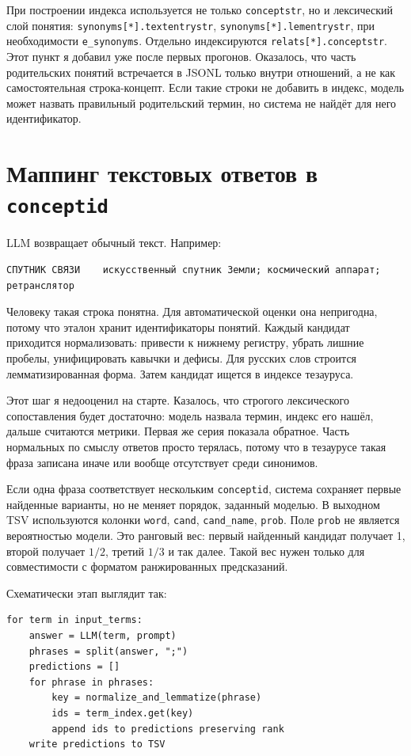 \documentclass[12pt,a4paper,oneside,openany]{report}
\begin{document}
При построении индекса используется не только \texttt{conceptstr}, но и лексический слой понятия: \texttt{synonyms[*].textentrystr}, \texttt{synonyms[*].lementrystr}, при необходимости \texttt{e\_synonyms}. Отдельно индексируются \texttt{relats[*].conceptstr}. Этот пункт я добавил уже после первых прогонов. Оказалось, что часть родительских понятий встречается в JSONL только внутри отношений, а не как самостоятельная строка-концепт. Если такие строки не добавить в индекс, модель может назвать правильный родительский термин, но система не найдёт для него идентификатор.

\section{Маппинг текстовых ответов в \texttt{conceptid}}

LLM возвращает обычный текст. Например:
\begin{verbatim}
СПУТНИК СВЯЗИ    искусственный спутник Земли; космический аппарат; ретранслятор
\end{verbatim}
Человеку такая строка понятна. Для автоматической оценки она непригодна, потому что эталон хранит идентификаторы понятий. Каждый кандидат приходится нормализовать: привести к нижнему регистру, убрать лишние пробелы, унифицировать кавычки и дефисы. Для русских слов строится лемматизированная форма. Затем кандидат ищется в индексе тезауруса.

Этот шаг я недооценил на старте. Казалось, что строгого лексического сопоставления будет достаточно: модель назвала термин, индекс его нашёл, дальше считаются метрики. Первая же серия показала обратное. Часть нормальных по смыслу ответов просто терялась, потому что в тезаурусе такая фраза записана иначе или вообще отсутствует среди синонимов.

Если одна фраза соответствует нескольким \texttt{conceptid}, система сохраняет первые найденные варианты, но не меняет порядок, заданный моделью. В выходном TSV используются колонки \texttt{word}, \texttt{cand}, \texttt{cand\_name}, \texttt{prob}. Поле \texttt{prob} не является вероятностью модели. Это ранговый вес: первый найденный кандидат получает 1, второй получает $1/2$, третий $1/3$ и так далее. Такой вес нужен только для совместимости с форматом ранжированных предсказаний.

Схематически этап выглядит так:
\begin{verbatim}
for term in input_terms:
    answer = LLM(term, prompt)
    phrases = split(answer, ";")
    predictions = []
    for phrase in phrases:
        key = normalize_and_lemmatize(phrase)
        ids = term_index.get(key)
        append ids to predictions preserving rank
    write predictions to TSV
\end{verbatim}
\end{document}
